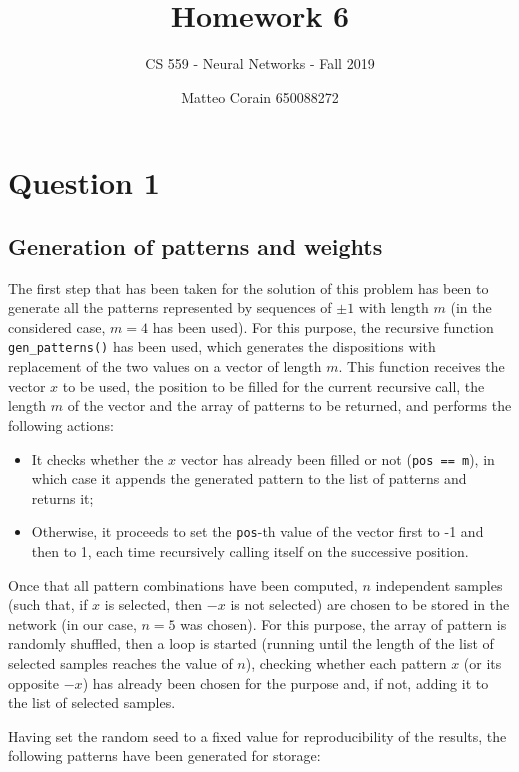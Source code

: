 \documentclass[letterpaper,headings=standardclasses]{scrartcl}
\title{Homework 6}
\subtitle{CS 559 - Neural Networks - Fall 2019}
\author{Matteo Corain 650088272}
\begin{document}
\maketitle

\section{Question 1}

\subsection{Generation of patterns and weights}

The first step that has been taken for the solution of this problem has been to generate all the patterns represented by sequences of $\pm 1$ with length $m$ (in the considered case, $m = 4$ has been used). For this purpose, the recursive function \texttt{gen\_patterns()} has been used, which generates the dispositions with replacement of the two values on a vector of length $m$. This function receives the vector $x$ to be used, the position to be filled for the current recursive call, the length $m$ of the vector and the array of patterns to be returned, and performs the following actions:

\begin{itemize}
    \item It checks whether the $x$ vector has already been filled or not (\texttt{pos == m}), in which case it appends the generated pattern to the list of patterns and returns it;
    \item Otherwise, it proceeds to set the \texttt{pos}-th value of the vector first to -1 and then to 1, each time recursively calling itself on the successive position.
\end{itemize}

Once that all pattern combinations have been computed, $n$ independent samples (such that, if $x$ is selected, then $-x$ is not selected) are chosen to be stored in the network (in our case, $n = 5$ was chosen). For this purpose, the array of pattern is randomly shuffled, then a loop is started (running until the length of the list of selected samples reaches the value of $n$), checking whether each pattern $x$ (or its opposite $-x$) has already been chosen for the purpose and, if not, adding it to the list of selected samples.

Having set the random seed to a fixed value for reproducibility of the results, the following patterns have been generated for storage:
\end{document}
